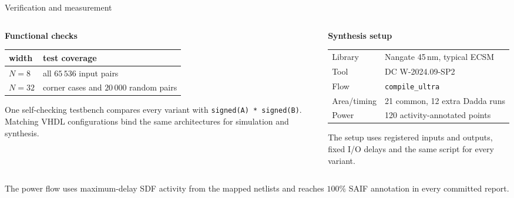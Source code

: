 \documentclass[aspectratio=169,11pt]{beamer}
\begin{document}
\begin{frame}{Verification and measurement}

\begin{columns}[T]
\begin{column}{0.48\textwidth}
\footnotesize
\textbf{Functional checks}

\vspace{3pt}
\begin{tabular}{@{}ll@{}}
\toprule
width & test coverage \\
\midrule
$N=8$ & all $65\,536$ input pairs \\
$N=32$ & corner cases and $20\,000$ random pairs \\
\bottomrule
\end{tabular}

\vspace{7pt}
One self-checking testbench compares every variant with
\texttt{signed(A) * signed(B)}. Matching VHDL configurations bind the same
architectures for simulation and synthesis.
\end{column}

\begin{column}{0.48\textwidth}
\footnotesize
\textbf{Synthesis setup}

\vspace{3pt}
\begin{tabular}{@{}ll@{}}
Library & Nangate 45\,nm, typical ECSM \\
Tool & DC W-2024.09-SP2 \\
Flow & \texttt{compile\_ultra} \\
Area/timing & 21 common, 12 extra Dadda runs \\
Power & 120 activity-annotated points \\
\end{tabular}

\vspace{7pt}
The setup uses registered inputs and outputs, fixed I/O delays and the same
script for every variant.
\end{column}
\end{columns}

\vspace{8pt}
\footnotesize
The power flow uses maximum-delay SDF activity from the mapped netlists and
reaches $100\%$ SAIF annotation in every committed report.

\end{frame}
\end{document}
